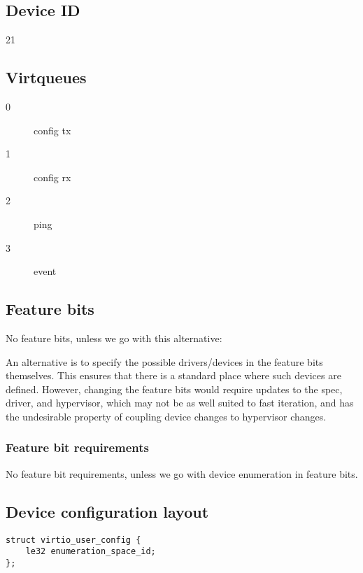 \subsection{Device ID}\label{sec:Device Types / User Device / Device ID}

21

\subsection{Virtqueues}\label{sec:Device Types / User Device / Virtqueues}

\begin{description}
\item[0] config tx
\item[1] config rx
\item[2] ping
\item[3] event
\end{description}

\subsection{Feature bits}\label{sec: Device Types / User Device / Feature bits }

No feature bits, unless we go with this alternative:

An alternative is to specify the possible drivers/devices in the feature bits themselves.
This ensures that there is a standard place where such devices are defined.
However, changing the feature bits would require updates to the spec, driver, and hypervisor,
which may not be as well suited to fast iteration,
and has the undesirable property of coupling device changes to hypervisor changes.

\subsubsection{Feature bit requirements}\label{sec:Device Types / User Device / Feature bit requirements}

No feature bit requirements, unless we go with device enumeration in feature bits.

\subsection{Device configuration layout}\label{sec:Device Types / User Device / Device configuration layout}

\begin{lstlisting}
struct virtio_user_config {
    le32 enumeration_space_id;
};
\end{lstlisting}

